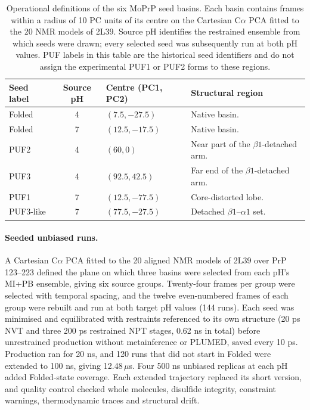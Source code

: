 \begin{table}[htbp]
    \centering
    \small
    \begin{tabularx}{\textwidth}{@{}lcl>{\raggedright\arraybackslash}X@{}}
    \toprule
        \textbf{Seed label} & \textbf{Source pH} & \textbf{Centre (PC1, PC2)} & \textbf{Structural region} \\
    \midrule
        Folded & 4 & $(7.5,-27.5)$ & Native basin. \\
        Folded & 7 & $(12.5,-17.5)$ & Native basin. \\
        PUF2 & 4 & $(60,0)$ & Near part of the $\beta1$-detached arm. \\
        PUF3 & 4 & $(92.5,42.5)$ & Far end of the $\beta1$-detached arm. \\
        PUF1 & 7 & $(12.5,-77.5)$ & Core-distorted lobe. \\
        PUF3-like & 7 & $(77.5,-27.5)$ & Detached $\beta1$--$\alpha1$ set. \\
    \bottomrule
    \end{tabularx}
    \caption{Operational definitions of the six MoPrP seed basins. Each basin contains frames within a radius of 10 PC units of its centre on the Cartesian C$\alpha$ PCA fitted to the 20 NMR models of 2L39. Source pH identifies the restrained ensemble from which seeds were drawn; every selected seed was subsequently run at both pH values. PUF labels in this table are the historical seed identifiers and do not assign the experimental PUF1 or PUF2 forms to these regions.}
    \label{tab:biofeat-moprp-basins}
\end{table}

\paragraph{Seeded unbiased runs.}
A Cartesian C$\alpha$ PCA fitted to the 20 aligned NMR models of 2L39 over PrP 123--223 defined the plane on which three basins were selected from each pH's MI+PB ensemble, giving six source groups. Twenty-four frames per group were selected with temporal spacing, and the twelve even-numbered frames of each group were rebuilt and run at both target pH values (144 runs). Each seed was minimised and equilibrated with restraints referenced to its own structure (20 ps NVT and three 200 ps restrained NPT stages, 0.62 ns in total) before unrestrained production without metainference or PLUMED, saved every 10 ps. Production ran for 20 ns, and 120 runs that did not start in Folded were extended to 100 ns, giving 12.48\,$\mu$s. Four 500 ns unbiased replicas at each pH added Folded-state coverage. Each extended trajectory replaced its short version, and quality control checked whole molecules, disulfide integrity, constraint warnings, thermodynamic traces and structural drift.

